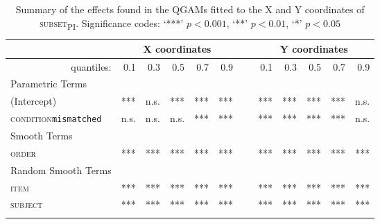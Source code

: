 \begin{table}\fontsize{9}{10}
\caption{Summary of the effects found in the QGAMs fitted to the X and Y coordinates of \textsc{subset\textsubscript{PI}}. Significance codes: `***' $p < 0.001$, `**' $p < 0.01$, `*' $p < 0.05$}
\label{tab:8.8}
\centering
\begin{tabular}{lrrrrrrrrrrr}
\lsptoprule
~                   & \multicolumn{5}{c}{X coordinates}    & \multicolumn{1}{c}{}                          & \multicolumn{5}{c}{Y coordinates}                               \\
\midrule
\multicolumn{1}{r}{quantiles:}          & 0.1        & 0.3        & 0.5        & 0.7        & 0.9  & ~      & 0.1        & 0.3        & 0.5        & 0.7        & 0.9         \\
\midrule
Parametric Terms    & \textbf{~} & \textbf{~} & \textbf{~} & \textbf{~} & \textbf{~} & \textbf{~} & \textbf{~} & \textbf{~} & \textbf{~} & \textbf{~}  \\
\midrule
(Intercept)         & ***        & n.s.         & ***        & ***        & ***    & ~    & ***        & ***        & ***        & ***        & n.s.          \\
\textsc{condition}\texttt{mismatched} & n.s.       & n.s.          & n.s.        & ***        & *** & ~       & ***       & ***        & ***        & ***        & n.s.         \\
\midrule
Smooth Terms        & \textbf{~} & \textbf{~} & \textbf{~} & \textbf{~} & \textbf{~} & \textbf{~} & \textbf{~} & \textbf{~} & \textbf{~} & \textbf{~}  \\
\midrule
\textsc{order}               & ***        & ***        & ***        & ***        & ***  & ~      & ***        & ***        & ***        & ***        & ***         \\
\midrule
Random Smooth Terms & \textbf{~} & \textbf{~} & \textbf{~} & \textbf{~} & \textbf{~} & \textbf{~} & \textbf{~} & \textbf{~} & \textbf{~} & \textbf{~}  \\
\midrule
\textsc{item}                & ***        & ***        & ***        & ***        & ***  & ~      & ***        & ***        & ***        & ***        & ***         \\
\textsc{subject}             & ***        & ***        & ***        & ***        & ***  & ~      & ***        & ***        & ***        & ***        & ***        \\
\lspbottomrule
\end{tabular}
\end{table}

